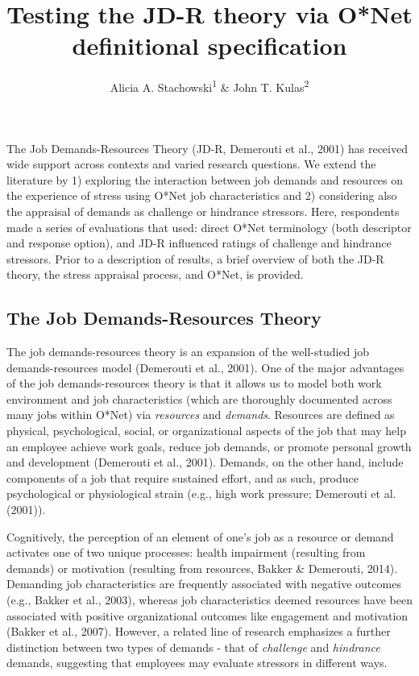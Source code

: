 \documentclass[
  man]{apa6}
\title{Testing the JD-R theory via O*Net definitional specification}
\author{Alicia A. Stachowski\textsuperscript{1} \& John T. Kulas\textsuperscript{2}}
\date{}
\affiliation{\vspace{0.5cm}\textsuperscript{1} University of Wisconsin - Stout\\\textsuperscript{2} eRg}
\begin{document}
\maketitle

The Job Demands-Resources Theory (JD-R, Demerouti et al., 2001) has received wide support across contexts and varied research questions. We extend the literature by 1) exploring the interaction between job demands and resources on the experience of stress using O*Net job characteristics and 2) considering also the appraisal of demands as challenge or hindrance stressors. Here, respondents made a series of evaluations that used: direct O*Net terminology (both descriptor and response option), and JD-R influenced ratings of challenge and hindrance stressors. Prior to a description of results, a brief overview of both the JD-R theory, the stress appraisal process, and O*Net, is provided.

\hypertarget{the-job-demands-resources-theory}{%
\subsection{The Job Demands-Resources Theory}\label{the-job-demands-resources-theory}}

The job demands-resources theory is an expansion of the well-studied job demands-resources model (Demerouti et al., 2001). One of the major advantages of the job demands-resources theory is that it allows us to model both work environment and job characteristics (which are thoroughly documented across many jobs within O*Net) via \emph{resources} and \emph{demands}. Resources are defined as physical, psychological, social, or organizational aspects of the job that may help an employee achieve work goals, reduce job demands, or promote personal growth and development (Demerouti et al., 2001). Demands, on the other hand, include components of a job that require sustained effort, and as such, produce psychological or physiological strain (e.g., high work pressure; Demerouti et al. (2001)).

Cognitively, the perception of an element of one's job as a resource or demand activates one of two unique processes: health impairment (resulting from demands) or motivation (resulting from resources, Bakker \& Demerouti, 2014). Demanding job characteristics are frequently associated with negative outcomes (e.g., Bakker et al., 2003), whereas job characteristics deemed resources have been associated with positive organizational outcomes like engagement and motivation (Bakker et al., 2007). However, a related line of research emphasizes a further distinction between two types of demands - that of \emph{challenge} and \emph{hindrance} demands, suggesting that employees may evaluate stressors in different ways.
\end{document}
